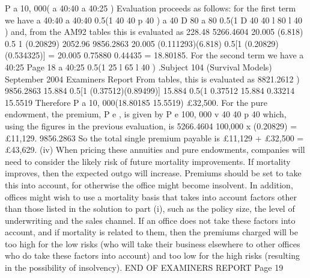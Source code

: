 \documentclass[a4paper,12pt]{article}
\begin{document}
P a 10, 000( a 40:40 a 40:25 )
Evaluation proceeds as follows: for the first term we have
a 40:40 a 40:40 0.5(1 40 40 p 40 )
a 40
D 80
a 80 0.5(1
D 40
40 l 80
l 40
)
and, from the AM92 tables this is evaluated as
228.48
5266.4604
20.005
(6.818) 0.5 1 (0.20829)
2052.96
9856.2863
20.005 (0.111293)(6.818) 0.5[1 (0.20829)(0.534325)]
= 20.005 0.75880 0.44435
= 18.80185.
For the second term we have
a 40:25
Page 18
a 40:25
0.5(1
25 l 65
l 40
) .Subject 104 (Survival Models)
September 2004
Examiners Report
From tables, this is evaluated as
8821.2612
)
9856.2863
15.884 0.5[1 (0.37512)(0.89499)]
15.884 0.5(1 0.37512
15.884 0.33214
15.5519
Therefore
P a
10, 000(18.80185 15.5519)
£32,500.
For the pure endowment, the premium, P e , is given by
P e
100, 000 v 40 40 p 40
which, using the figures in the previous evaluation, is
5266.4604
100,000 x (0.20829)
= £11,129.
9856.2863
So the total single premium payable is
£11,129 + £32,500 = £43,629.
(iv)
When pricing these annuities and pure endowments, companies will need to
consider the likely risk of future mortality improvements.
If mortality improves, then the expected outgo will increase. Premiums
should be set to take this into account, for otherwise the office might become
insolvent.
In addition, offices might wish to use a mortality basis that takes into account
factors other than those listed in the solution to part (i), such as the policy size,
the level of underwriting and the sales channel.
If an office does not take these factors into account, and if mortality is related
to them, then the premiums charged will be too high for the low risks (who
will take their business elsewhere to other offices who do take these factors
into account) and too low for the high risks (resulting in the possibility of
insolvency).
END OF EXAMINERS REPORT
Page 19
\end{document}
